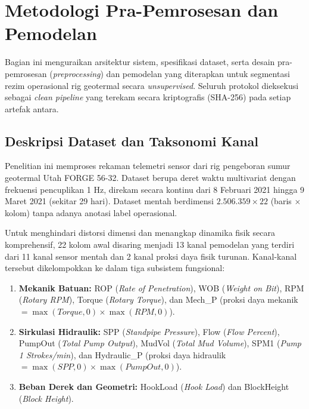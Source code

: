 \documentclass[conference]{IEEEtran}
\begin{document}
\section{Metodologi Pra-Pemrosesan dan Pemodelan}

Bagian ini menguraikan arsitektur sistem, spesifikasi dataset, serta desain pra-pemrosesan (\textit{preprocessing}) dan pemodelan yang diterapkan untuk segmentasi rezim operasional rig geotermal secara \textit{unsupervised}. Seluruh protokol dieksekusi sebagai \textit{clean pipeline} yang terekam secara kriptografis (SHA-256) pada setiap artefak antara.

\subsection{Deskripsi Dataset dan Taksonomi Kanal}
Penelitian ini memproses rekaman telemetri sensor dari rig pengeboran sumur geotermal Utah FORGE 56-32. Dataset berupa deret waktu multivariat dengan frekuensi pencuplikan 1 Hz, direkam secara kontinu dari 8 Februari 2021 hingga 9 Maret 2021 (sekitar 29 hari). Dataset mentah berdimensi $2.506.359 \times 22$ (baris $\times$ kolom) tanpa adanya anotasi label operasional.

Untuk menghindari distorsi dimensi dan menangkap dinamika fisik secara komprehensif, 22 kolom awal disaring menjadi 13 kanal pemodelan yang terdiri dari 11 kanal sensor mentah dan 2 kanal proksi daya fisik turunan. Kanal-kanal tersebut dikelompokkan ke dalam tiga subsistem fungsional:

\begin{enumerate}
\item \textbf{Mekanik Batuan:} ROP (\textit{Rate of Penetration}), WOB (\textit{Weight on Bit}), RPM (\textit{Rotary RPM}), Torque (\textit{Rotary Torque}), dan Mech\_P (proksi daya mekanik $= \max(Torque,0) \times \max(RPM,0)$).
\item \textbf{Sirkulasi Hidraulik:} SPP (\textit{Standpipe Pressure}), Flow (\textit{Flow Percent}), PumpOut (\textit{Total Pump Output}), MudVol (\textit{Total Mud Volume}), SPM1 (\textit{Pump 1 Strokes/min}), dan Hydraulic\_P (proksi daya hidraulik $= \max(SPP,0) \times \max(PumpOut,0)$).
\item \textbf{Beban Derek dan Geometri:} HookLoad (\textit{Hook Load}) dan BlockHeight (\textit{Block Height}).
\end{enumerate}
\end{document}

